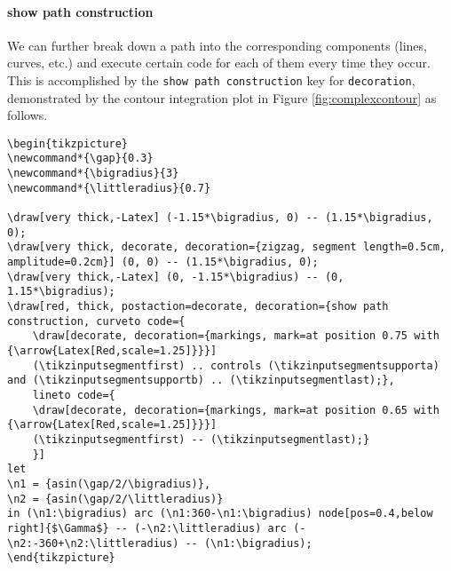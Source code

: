 \paragraph{show path construction}
We can further break down a path into the corresponding components (lines, curves, etc.) and execute certain code for each of them every time they occur. This is accomplished by the \texttt{show path construction} key for \texttt{decoration}, demonstrated by the contour integration plot in Figure \ref{fig:complexcontour} as follows.
\begin{lstlisting}
\begin{tikzpicture}
\newcommand*{\gap}{0.3}
\newcommand*{\bigradius}{3}
\newcommand*{\littleradius}{0.7}

\draw[very thick,-Latex] (-1.15*\bigradius, 0) -- (1.15*\bigradius, 0);
\draw[very thick, decorate, decoration={zigzag, segment length=0.5cm, amplitude=0.2cm}] (0, 0) -- (1.15*\bigradius, 0);
\draw[very thick,-Latex] (0, -1.15*\bigradius) -- (0, 1.15*\bigradius);
\draw[red, thick, postaction=decorate, decoration={show path construction, curveto code={
    \draw[decorate, decoration={markings, mark=at position 0.75 with {\arrow{Latex[Red,scale=1.25]}}}] 
    (\tikzinputsegmentfirst) .. controls (\tikzinputsegmentsupporta) and (\tikzinputsegmentsupportb) .. (\tikzinputsegmentlast);},
    lineto code={
    \draw[decorate, decoration={markings, mark=at position 0.65 with {\arrow{Latex[Red,scale=1.25]}}}] 
    (\tikzinputsegmentfirst) -- (\tikzinputsegmentlast);}
    }]  
let
\n1 = {asin(\gap/2/\bigradius)},
\n2 = {asin(\gap/2/\littleradius)}
in (\n1:\bigradius) arc (\n1:360-\n1:\bigradius) node[pos=0.4,below right]{$\Gamma$} -- (-\n2:\littleradius) arc (-\n2:-360+\n2:\littleradius) -- (\n1:\bigradius);
\end{tikzpicture}
\end{lstlisting}
